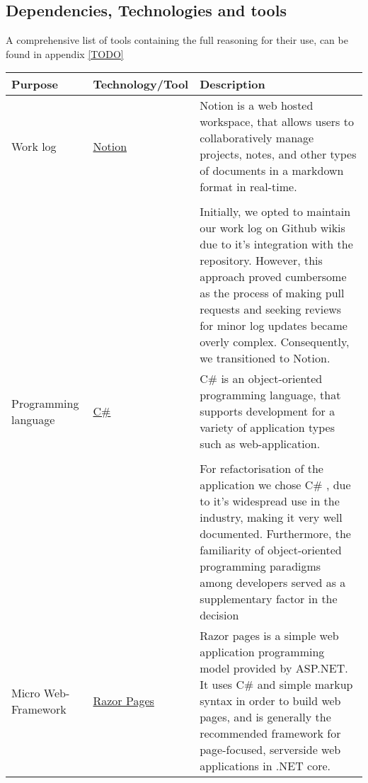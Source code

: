\subsection{Dependencies, Technologies and tools}


A comprehensive list of tools containing the full reasoning for their use, can be found in appendix \ref{TODO}

\begin{longtable}{|p{}|p{} | p{}|}
    \hline
    \textbf{Purpose} & \textbf{Technology/Tool} & \textbf{Description}\\
    \hline
    Work log & \href{https://www.notion.so/help/guides/category/documentation}{Notion} & Notion is a web hosted workspace, that allows users to collaboratively manage projects, notes, and other types of documents in a markdown format in real-time.\\
    &&\\
    && Initially, we opted to maintain our work log on Github wikis due to it's integration with the repository. However, this approach proved cumbersome as the process of making pull requests and seeking reviews for minor log updates became overly complex. Consequently, we transitioned to Notion.\\ 
    \hline
    Programming language & \href{https://learn.microsoft.com/en-us/dotnet/csharp/}{C\#} &
    C\#  is an object-oriented programming language, that supports development for a variety of application types such as web-application.\\
    && \\
    && For refactorisation of the application we chose C\# , due to it's widespread use in the industry, making it very well documented. Furthermore, the familiarity of object-oriented programming paradigms among developers served as a supplementary factor in the decision\\
    \hline
    Micro Web-Framework & \href{https://learn.microsoft.com/en-us/aspnet/core/razor-pages/?view=aspnetcore-8.0&tabs=visual-studio}{Razor Pages} & Razor pages is a simple web application programming model provided by ASP.NET. It uses C\# and simple markup syntax in order to build web pages, and is generally the recommended framework for page-focused, serverside web applications in .NET core.\\

\end{longtable}
